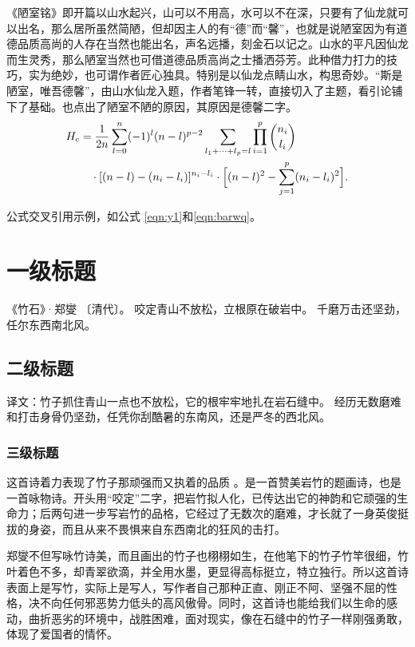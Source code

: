 《陋室铭》即开篇以山水起兴，山可以不用高，水可以不在深，只要有了仙龙就可以出名，那么居所虽然简陋，但却因主人的有“德”而“馨”，也就是说陋室因为有道德品质高尚的人存在当然也能出名，声名远播，刻金石以记之。山水的平凡因仙龙而生灵秀，那么陋室当然也可借道德品质高尚之士播洒芬芳。此种借力打力的技巧，实为绝妙，也可谓作者匠心独具。特别是以仙龙点睛山水，构思奇妙。“斯是陋室，唯吾德馨”，由山水仙龙入题，作者笔锋一转，直接切入了主题，看引论铺下了基础。也点出了陋室不陋的原因，其原因是德馨二字。
\begin{equation}
    \label{eqn:barwq}
    \begin{split}
        H_c&=\frac{1}{2n} \sum^n_{l=0}(-1)^{l}(n-{l})^{p-2}
        \sum_{l _1+\dots+ l _p=l}\prod^p_{i=1} \binom{n_i}{l _i}\\
        &\quad\cdot[(n-l )-(n_i-l _i)]^{n_i-l _i}\cdot
        \Bigl[(n-l )^2-\sum^p_{j=1}(n_i-l _i)^2\Bigr].
    \end{split}
\end{equation}

公式交叉引用示例，如公式 \eqref{eqn:y1}和\eqref{eqn:barwq}。

\section{一级标题}
《竹石》·郑燮 〔清代〕。
咬定青山不放松，立根原在破岩中。
千磨万击还坚劲，任尔东西南北风。

\subsection{二级标题}
译文：竹子抓住青山一点也不放松，它的根牢牢地扎在岩石缝中。
经历无数磨难和打击身骨仍坚劲，任凭你刮酷暑的东南风，还是严冬的西北风。

\subsubsection{三级标题}
这首诗着力表现了竹子那顽强而又执着的品质 。是一首赞美岩竹的题画诗，也是一首咏物诗。开头用“咬定”二字，把岩竹拟人化，已传达出它的神韵和它顽强的生命力；后两句进一步写岩竹的品格，它经过了无数次的磨难，才长就了一身英俊挺拔的身姿，而且从来不畏惧来自东西南北的狂风的击打。

郑燮不但写咏竹诗美，而且画出的竹子也栩栩如生，在他笔下的竹子竹竿很细，竹叶着色不多，却青翠欲滴，并全用水墨，更显得高标挺立，特立独行。所以这首诗表面上是写竹，实际上是写人，写作者自己那种正直、刚正不阿、坚强不屈的性格，决不向任何邪恶势力低头的高风傲骨。同时，这首诗也能给我们以生命的感动，曲折恶劣的环境中，战胜困难，面对现实，像在石缝中的竹子一样刚强勇敢，体现了爱国者的情怀。

